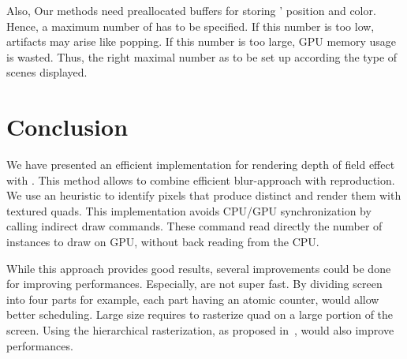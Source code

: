 Also, Our methods need preallocated buffers for storing \bokehs' position and color. Hence, a maximum number of \bokehs has to be specified. If this number is too low, artifacts may arise like \bokeh popping. If this number is too large, GPU memory usage is wasted. Thus, the right maximal number as to be set up according the type of scenes displayed.

\section{Conclusion}
We have presented an efficient implementation for rendering depth of field effect with \bokehs. This method allows to combine efficient blur-approach with \bokeh reproduction. We use an heuristic to identify pixels that produce distinct \bokeh and render them with textured quads. This implementation avoids CPU/GPU synchronization by calling indirect draw commands. These command read directly the number of instances to draw on GPU, without back reading from the CPU.


While this approach provides good results, several improvements could be done for improving performances. Especially,  are not super fast. By dividing screen into four parts for example, each part having an atomic counter, would allow better scheduling. Large \coc size requires to rasterize quad on a large portion of the screen. Using the hierarchical rasterization, as proposed in~\cite{Futurmark11}, would also improve performances.



